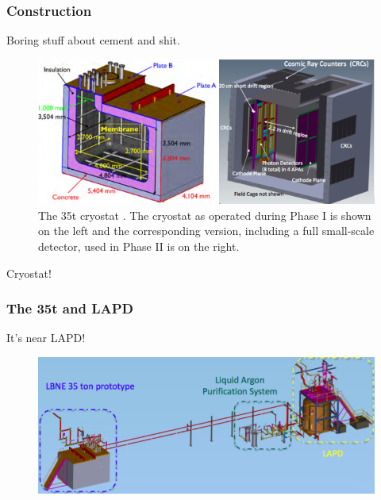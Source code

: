 \subsubsection{Construction}\label{sec:35tCryostatConstruction}

Boring stuff about cement and shit.

\begin{figure}[ht]
  \centering
  \includegraphics[width=15cm]{35tCryostat.png}
  \caption{The 35t cryostat \cite{LBNE35tPhaseI}.  The cryostat as operated during Phase I is shown on the left and the corresponding version, including a full small-scale detector, used in Phase II is on the right.}
  \label{fig:35tCryostat}
\end{figure}

Cryostat!

\subsubsection{The 35t and LAPD}\label{35tLAPD}

It's near LAPD!

\begin{figure}[ht]
  \centering
  \includegraphics[width=15cm]{35tLAPD.png}
  \caption{}
  \label{fig:35tLAPD}
\end{figure}

